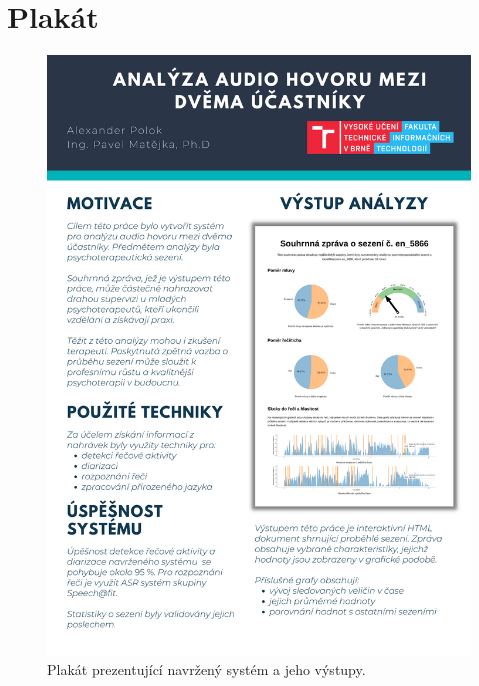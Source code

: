 \chapter{Plakát}
\label{chap:Poster}
\begin{figure}[ht]
  \centering
  \includegraphics[height=0.67\textheight]{prilohy/plakat.pdf}
  \caption{Plakát prezentující navržený systém a jeho výstupy.}
  \label{fig:Poster}
\end{figure}

